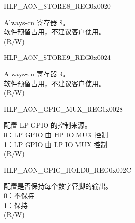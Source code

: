 \begin{register}{H}{LP\_AON\_STORE8\_REG}{0x0020}\label{regdesc:LPAONSTORE8REG}
%
\regnewline%
\begin{regdesc}\begin{reglist}
\label{fielddesc:LPAONLPAONSTORE8}\item [LP\_AON\_LP\_AON\_STORE8] Always-on 寄存器 8。\\
软件预留占用，不建议客户使用。\\
(R/W)
\end{reglist}\end{regdesc}
\end{register}

\begin{register}{H}{LP\_AON\_STORE9\_REG}{0x0024}\label{regdesc:LPAONSTORE9REG}
%
\regnewline%
\begin{regdesc}\begin{reglist}
\label{fielddesc:LPAONLPAONSTORE9}\item [LP\_AON\_LP\_AON\_STORE9] Always-on 寄存器 9。\\
软件预留占用，不建议客户使用。\\
(R/W)
\end{reglist}\end{regdesc}
\end{register}

\begin{register}{H}{LP\_AON\_GPIO\_MUX\_REG}{0x0028}\label{regdesc:LPAONGPIOMUXREG}
%
%
\regnewline%
\begin{regdesc}\begin{reglist}
\label{fielddesc:LPAONGPIOMUXSEL}\item [LP\_AON\_GPIO\_MUX\_SEL] 配置 LP GPIO 的控制来源。\\
0：LP GPIO 由 HP IO MUX 控制\\
1：LP GPIO 由 LP IO MUX 控制\\
(R/W)
\end{reglist}\end{regdesc}
\end{register}

\begin{register}{H}{LP\_AON\_GPIO\_HOLD0\_REG}{0x002C}\label{regdesc:LPAONGPIOHOLD0REG}
%
\regnewline%
\begin{regdesc}\begin{reglist}
\label{fielddesc:LPAONGPIOHOLD0}\item [LP\_AON\_GPIO\_HOLD0] 配置是否保持每个数字管脚的输出。\\
0：不保持\\
1：保持\\
(R/W)
\end{reglist}\end{regdesc}
\end{register}


